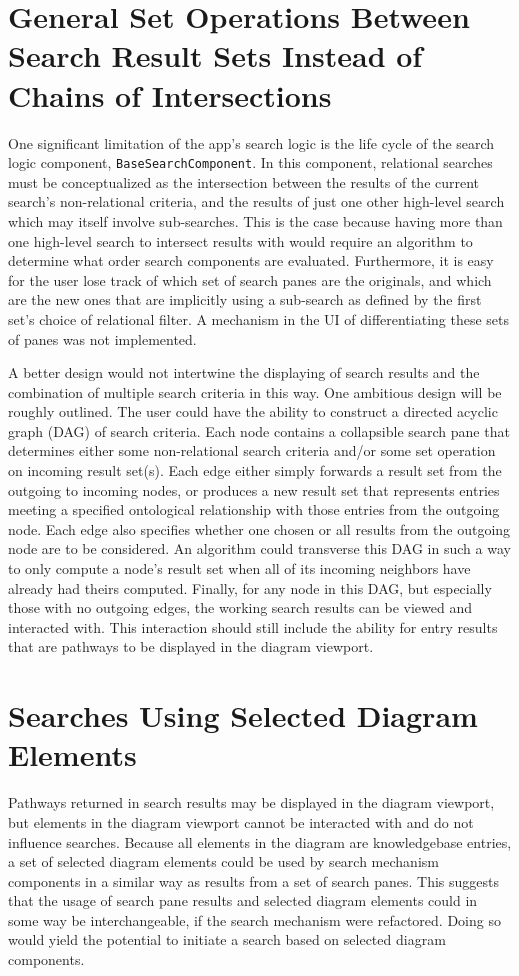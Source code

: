 \documentclass[12pt]{report}
\begin{document}
\section {General Set Operations Between Search Result Sets Instead of Chains of Intersections}
One significant limitation of the app's search logic is the life cycle of the search logic component, \verb|BaseSearchComponent|. In this component, relational searches must be conceptualized as the intersection between the results of the current search's non-relational criteria, and the results of just one other high-level search which may itself involve sub-searches. This is the case because having more than one high-level search to intersect results with would require an algorithm to determine what order search components are evaluated. Furthermore, it is easy for the user lose track of which set of search panes are the originals, and which are the new ones that are implicitly using a sub-search as defined by the first set's choice of relational filter. A mechanism in the UI of differentiating these sets of panes was not implemented.

A better design would not intertwine the displaying of search results and the combination of multiple search criteria in this way. One ambitious design will be roughly outlined. The user could have the ability to construct a directed acyclic graph (DAG) of search criteria. Each node contains a collapsible search pane that determines either some non-relational search criteria and/or some set operation on incoming result set(s). Each edge either simply forwards a result set from the outgoing to incoming nodes, or produces a new result set that represents entries meeting a specified ontological relationship with those entries from the outgoing node. Each edge also specifies whether one chosen or all results from the outgoing node are to be considered. An algorithm could transverse this DAG in such a way to only compute a node's result set when all of its incoming neighbors have already had theirs computed. Finally, for any node in this DAG, but especially those with no outgoing edges, the working search results can be viewed and interacted with. This interaction should still include the ability for entry results that are pathways to be displayed in the diagram viewport.

\section {Searches Using Selected Diagram Elements}
Pathways returned in search results may be displayed in the diagram viewport, but elements in the diagram viewport cannot be interacted with and do not influence searches. Because all elements in the diagram are knowledgebase entries, a set of selected diagram elements could be used by search mechanism components in a similar way as results from a set of search panes. This suggests that the usage of search pane results and selected diagram elements could in some way be interchangeable, if the search mechanism were refactored. Doing so would yield the potential to initiate a search based on selected diagram components.
\end{document}
